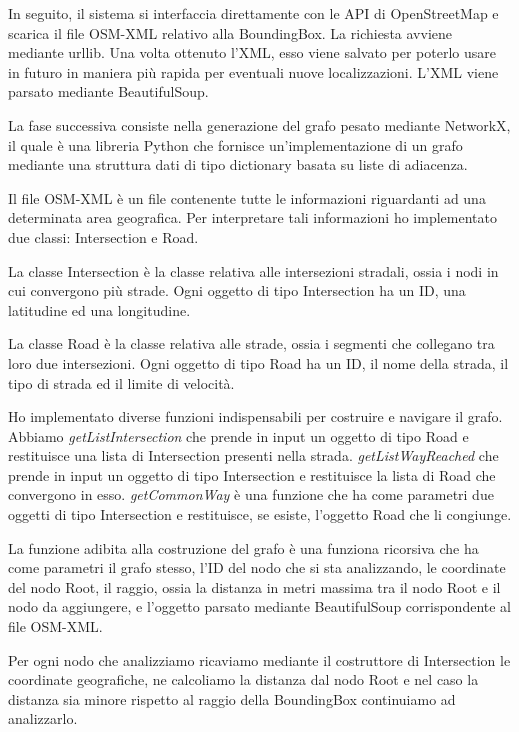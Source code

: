 \documentclass[12pt,a4paper,openright,twoside]{report}
\begin{document}
In seguito, il sistema si interfaccia direttamente con le API di OpenStreetMap e scarica il file OSM-XML relativo alla BoundingBox. La richiesta avviene mediante urllib. Una volta ottenuto l'XML, esso viene salvato per poterlo usare in futuro in maniera più rapida per eventuali nuove localizzazioni. L'XML viene parsato mediante BeautifulSoup.


La fase successiva consiste nella generazione del grafo pesato mediante NetworkX, il quale è una libreria Python che fornisce un'implementazione di un grafo mediante una struttura dati di tipo dictionary basata su liste di adiacenza.

Il file OSM-XML è un file contenente tutte le informazioni riguardanti ad una determinata area geografica. Per interpretare tali informazioni ho implementato due classi: Intersection e Road.

La classe Intersection è la classe relativa alle intersezioni stradali, ossia i nodi in cui convergono più strade. Ogni oggetto di tipo Intersection ha un ID, una latitudine ed una longitudine.


La classe Road è la classe relativa alle strade, ossia i segmenti che collegano tra loro due intersezioni. Ogni oggetto di tipo Road ha un ID, il nome della strada, il tipo di strada ed il limite di velocità. 


Ho implementato diverse funzioni indispensabili per costruire e navigare il grafo. Abbiamo \textit{getListIntersection} che prende in input un oggetto di tipo Road e restituisce una lista di Intersection presenti nella strada. \textit{getListWayReached} che prende in input un oggetto di tipo Intersection e restituisce la lista di Road che convergono in esso. \textit{getCommonWay} è una funzione che ha come parametri due oggetti di tipo Intersection e restituisce, se esiste, l'oggetto Road che li congiunge.


La funzione adibita alla costruzione del grafo è una funziona ricorsiva che ha come parametri il grafo stesso, l'ID del nodo che si sta analizzando, le coordinate del nodo Root, il raggio, ossia la distanza in metri massima tra il nodo Root e il nodo da aggiungere, e l'oggetto parsato mediante BeautifulSoup corrispondente al file OSM-XML.

Per ogni nodo che analizziamo ricaviamo mediante il costruttore di Intersection le coordinate geografiche, ne calcoliamo la distanza dal nodo Root e nel caso la distanza sia minore rispetto al raggio della BoundingBox continuiamo ad analizzarlo.
\end{document}
